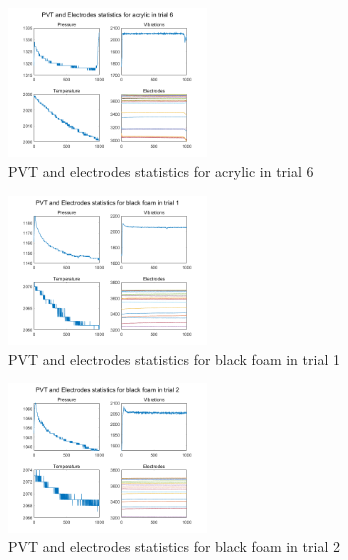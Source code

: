 \documentclass[10pt,twocolumn,letterpaper]{article}
\begin{document}
\begin{figure}[h]
\begin{center}
   \includegraphics[width=0.47\textwidth]{part1_3}
\end{center}
   \caption{PVT and electrodes statistics for acrylic in trial 6}
\label{fig:3}
\end{figure}

\begin{figure}[h]
\begin{center}
   \includegraphics[width=0.47\textwidth]{part1_4}
\end{center}
   \caption{PVT and electrodes statistics for black foam in trial 1}
\label{fig:4}
\end{figure}

\begin{figure}[h]
\begin{center}
   \includegraphics[width=0.47\textwidth]{part1_5}
\end{center}
   \caption{PVT and electrodes statistics for black foam in trial 2}
\label{fig:5}
\end{figure}
\end{document}

